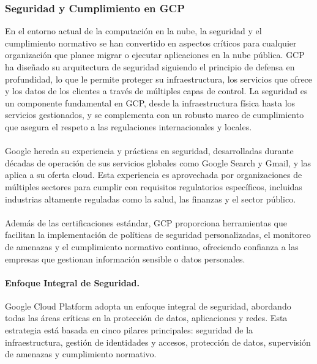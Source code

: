 {            \subsubsection{Seguridad y Cumplimiento en GCP}
                En el entorno actual de la computación en la nube, la seguridad y el cumplimiento normativo se han convertido en aspectos críticos para cualquier organización que planee migrar o ejecutar aplicaciones en la nube pública. GCP ha diseñado su arquitectura de seguridad siguiendo el principio de defensa en profundidad, lo que le permite proteger su infraestructura, los servicios que ofrece y los datos de los clientes a través de múltiples capas de control. La seguridad es un componente fundamental en GCP, desde la infraestructura física hasta los servicios gestionados, y se complementa con un robusto marco de cumplimiento que asegura el respeto a las regulaciones internacionales y locales.
            
                \paragraph{}Google hereda su experiencia y prácticas en seguridad, desarrolladas durante décadas de operación de sus servicios globales como Google Search y Gmail, y las aplica a su oferta cloud. Esta experiencia es aprovechada por organizaciones de múltiples sectores para cumplir con requisitos regulatorios específicos, incluidas industrias altamente reguladas como la salud, las finanzas y el sector público.
            
                \paragraph{}Además de las certificaciones estándar, GCP proporciona herramientas que facilitan la implementación de políticas de seguridad personalizadas, el monitoreo de amenazas y el cumplimiento normativo continuo, ofreciendo confianza a las empresas que gestionan información sensible o datos personales.
            
                \paragraph{Enfoque Integral de Seguridad.}
                Google Cloud Platform adopta un enfoque integral de seguridad, abordando todas las áreas críticas en la protección de datos, aplicaciones y redes. Esta estrategia está basada en cinco pilares principales: seguridad de la infraestructura, gestión de identidades y accesos, protección de datos, supervisión de amenazas y cumplimiento normativo.
            
}
